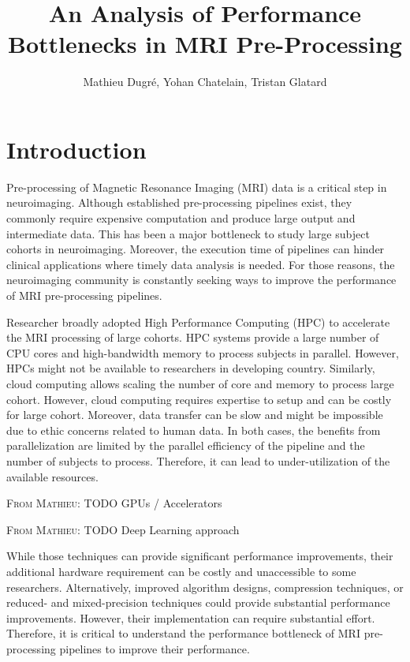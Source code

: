 \documentclass[conference]{IEEEtran}
\title{An Analysis of Performance Bottlenecks in MRI Pre-Processing}
\author{Mathieu Dugr\'e, Yohan Chatelain, Tristan Glatard}
\newcommand{\MD}[1]{\color{magenta}\textsc{From Mathieu: }#1\color{black}}
\begin{document}
\maketitle

\begin{abstract}
\end{abstract}

\section{Introduction}
Pre-processing of Magnetic Resonance Imaging (MRI) data is a critical step in neuroimaging. Although established pre-processing pipelines exist, they commonly require expensive computation and produce large output and intermediate data. This has been a major bottleneck to study large subject cohorts in neuroimaging. Moreover, the execution time of pipelines can hinder clinical applications where timely data analysis is needed. For those reasons, the neuroimaging community is constantly seeking ways to improve the performance of MRI pre-processing pipelines.

Researcher broadly adopted High Performance Computing (HPC) to accelerate the MRI processing of large cohorts. HPC systems provide a large number of CPU cores and high-bandwidth memory to process subjects in parallel. However, HPCs might not be available to researchers in developing country. Similarly, cloud computing allows scaling the number of core and memory to process large cohort. However, cloud computing requires expertise to setup and can be costly for large cohort. Moreover, data transfer can be slow and might be impossible due to ethic concerns related to human data. In both cases, the benefits from parallelization are limited by the parallel efficiency of the pipeline and the number of subjects to process. Therefore, it can lead to under-utilization of the available resources.

\MD{TODO GPUs / Accelerators}


\MD{TODO Deep Learning approach}


While those techniques can provide significant performance improvements, their additional hardware requirement can be costly and unaccessible to some researchers. Alternatively, improved algorithm designs, compression techniques, or reduced- and mixed-precision techniques could provide substantial performance improvements. However, their implementation can require substantial effort. Therefore, it is critical to understand the performance bottleneck of MRI pre-processing pipelines to improve their performance.
\end{document}
